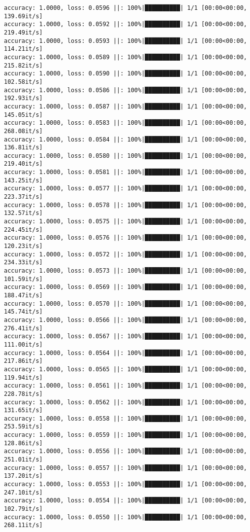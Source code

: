 \documentclass[
]{article}
\begin{document}
\begin{verbatim}
accuracy: 1.0000, loss: 0.0596 ||: 100%|██████████| 1/1 [00:00<00:00, 139.69it/s]
accuracy: 1.0000, loss: 0.0592 ||: 100%|██████████| 1/1 [00:00<00:00, 219.49it/s]
accuracy: 1.0000, loss: 0.0593 ||: 100%|██████████| 1/1 [00:00<00:00, 114.21it/s]
accuracy: 1.0000, loss: 0.0589 ||: 100%|██████████| 1/1 [00:00<00:00, 215.82it/s]
accuracy: 1.0000, loss: 0.0590 ||: 100%|██████████| 1/1 [00:00<00:00, 102.58it/s]
accuracy: 1.0000, loss: 0.0586 ||: 100%|██████████| 1/1 [00:00<00:00, 192.93it/s]
accuracy: 1.0000, loss: 0.0587 ||: 100%|██████████| 1/1 [00:00<00:00, 145.05it/s]
accuracy: 1.0000, loss: 0.0583 ||: 100%|██████████| 1/1 [00:00<00:00, 268.08it/s]
accuracy: 1.0000, loss: 0.0584 ||: 100%|██████████| 1/1 [00:00<00:00, 136.81it/s]
accuracy: 1.0000, loss: 0.0580 ||: 100%|██████████| 1/1 [00:00<00:00, 219.40it/s]
accuracy: 1.0000, loss: 0.0581 ||: 100%|██████████| 1/1 [00:00<00:00, 143.25it/s]
accuracy: 1.0000, loss: 0.0577 ||: 100%|██████████| 1/1 [00:00<00:00, 223.37it/s]
accuracy: 1.0000, loss: 0.0578 ||: 100%|██████████| 1/1 [00:00<00:00, 132.57it/s]
accuracy: 1.0000, loss: 0.0575 ||: 100%|██████████| 1/1 [00:00<00:00, 224.45it/s]
accuracy: 1.0000, loss: 0.0576 ||: 100%|██████████| 1/1 [00:00<00:00, 120.23it/s]
accuracy: 1.0000, loss: 0.0572 ||: 100%|██████████| 1/1 [00:00<00:00, 234.33it/s]
accuracy: 1.0000, loss: 0.0573 ||: 100%|██████████| 1/1 [00:00<00:00, 101.59it/s]
accuracy: 1.0000, loss: 0.0569 ||: 100%|██████████| 1/1 [00:00<00:00, 188.47it/s]
accuracy: 1.0000, loss: 0.0570 ||: 100%|██████████| 1/1 [00:00<00:00, 145.74it/s]
accuracy: 1.0000, loss: 0.0566 ||: 100%|██████████| 1/1 [00:00<00:00, 276.41it/s]
accuracy: 1.0000, loss: 0.0567 ||: 100%|██████████| 1/1 [00:00<00:00, 111.00it/s]
accuracy: 1.0000, loss: 0.0564 ||: 100%|██████████| 1/1 [00:00<00:00, 217.86it/s]
accuracy: 1.0000, loss: 0.0565 ||: 100%|██████████| 1/1 [00:00<00:00, 119.94it/s]
accuracy: 1.0000, loss: 0.0561 ||: 100%|██████████| 1/1 [00:00<00:00, 228.78it/s]
accuracy: 1.0000, loss: 0.0562 ||: 100%|██████████| 1/1 [00:00<00:00, 131.65it/s]
accuracy: 1.0000, loss: 0.0558 ||: 100%|██████████| 1/1 [00:00<00:00, 253.59it/s]
accuracy: 1.0000, loss: 0.0559 ||: 100%|██████████| 1/1 [00:00<00:00, 128.86it/s]
accuracy: 1.0000, loss: 0.0556 ||: 100%|██████████| 1/1 [00:00<00:00, 251.01it/s]
accuracy: 1.0000, loss: 0.0557 ||: 100%|██████████| 1/1 [00:00<00:00, 137.20it/s]
accuracy: 1.0000, loss: 0.0553 ||: 100%|██████████| 1/1 [00:00<00:00, 247.10it/s]
accuracy: 1.0000, loss: 0.0554 ||: 100%|██████████| 1/1 [00:00<00:00, 102.79it/s]
accuracy: 1.0000, loss: 0.0550 ||: 100%|██████████| 1/1 [00:00<00:00, 268.11it/s]

\end{verbatim}
\end{document}
